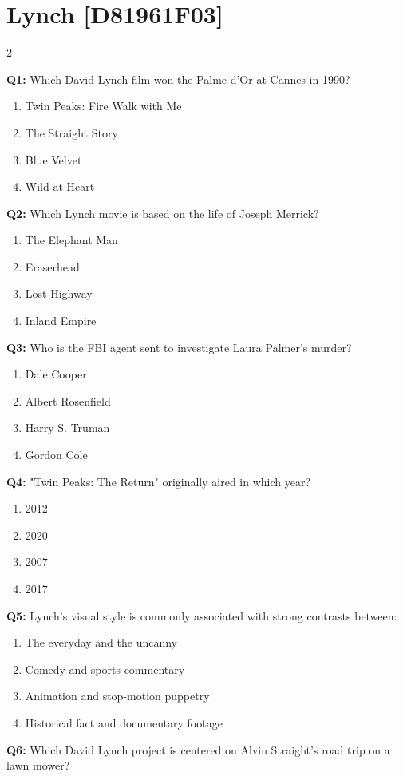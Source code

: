 \documentclass[10pt]{article}
\begin{document}
\section*{Lynch \footnotesize [D81961F03]}
\begin{multicols}{2}

\textbf{Q1:} Which David Lynch film won the Palme d'Or at Cannes in 1990?

\begin{enumerate}[label=\arabic*.]
\item Twin Peaks: Fire Walk with Me
\item The Straight Story
\item Blue Velvet
\item Wild at Heart
\end{enumerate}
\textbf{Q2:} Which Lynch movie is based on the life of Joseph Merrick?

\begin{enumerate}[label=\arabic*.]
\item The Elephant Man
\item Eraserhead
\item Lost Highway
\item Inland Empire
\end{enumerate}
\textbf{Q3:} Who is the FBI agent sent to investigate Laura Palmer's murder?

\begin{enumerate}[label=\arabic*.]
\item Dale Cooper
\item Albert Rosenfield
\item Harry S. Truman
\item Gordon Cole
\end{enumerate}
\textbf{Q4:} "Twin Peaks: The Return" originally aired in which year?

\begin{enumerate}[label=\arabic*.]
\item 2012
\item 2020
\item 2007
\item 2017
\end{enumerate}
\textbf{Q5:} Lynch's visual style is commonly associated with strong contrasts between:

\begin{enumerate}[label=\arabic*.]
\item The everyday and the uncanny
\item Comedy and sports commentary
\item Animation and stop-motion puppetry
\item Historical fact and documentary footage
\end{enumerate}
\textbf{Q6:} Which David Lynch project is centered on Alvin Straight's road trip on a lawn mower?


\end{multicols}
\end{document}
